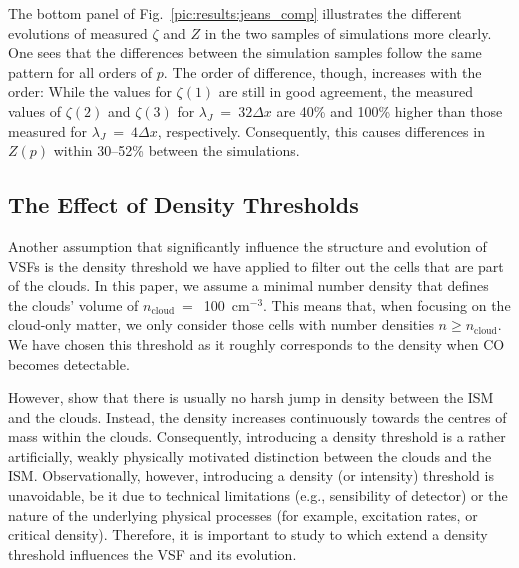 The bottom panel of Fig.~\ref{pic:results:jeans_comp} illustrates the different evolutions of measured $\zeta$ and $Z$ in the two samples of simulations more clearly.
One sees that the differences between the simulation samples follow the same pattern for all orders of $p$.
The order of difference, though, increases with the order:
While the values for $\zeta(1)$ are still in good agreement, the measured values of $\zeta(2)$ and $\zeta(3)$ for $\lambda_J$~=~$32\Delta{}x$ are 40\% and 100\% higher than those measured for $\lambda_J$~=~$4\Delta{}x$, respectively.
Consequently, this causes differences in $Z(p)$ within 30--52\% between the simulations.



\subsection{The Effect of Density Thresholds}\label{results:densthres}

Another assumption that significantly influence the structure and evolution of VSFs is the density threshold we have applied to filter out the cells that are part of the clouds.
In this paper, we assume a minimal number density that defines the clouds' volume of $n_\mathrm{cloud}~=$~100~cm$^{-3}$.
This means that, when focusing on the cloud-only matter, we only consider those cells with number densities $n \geq n_\mathrm{cloud}$.
We have chosen this threshold as it roughly corresponds to the density when CO becomes detectable.

However,  show that there is usually no harsh jump in density between the ISM and the clouds. 
Instead, the density increases continuously towards the centres of mass within the clouds. Consequently, introducing a density threshold is a rather artificially, weakly physically motivated distinction between the clouds and the ISM.
Observationally, however, introducing a density (or intensity) threshold is unavoidable, be it due to technical limitations (e.g., sensibility of detector) or the nature of the underlying physical processes (for example, excitation rates, or critical density).
Therefore, it is important to study to which extend a density threshold influences the VSF and its evolution.

